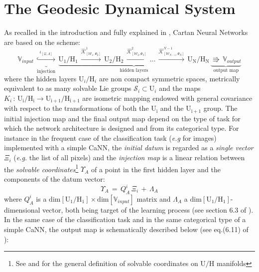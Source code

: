 \documentclass[10pt,a4paper]{article}
\begin{document}
\section{The Geodesic Dynamical System}
\label{geodynsys}
As recalled in the introduction and fully explained in
\cite{TSnaviga}, Cartan Neural Networks are based on the scheme:
\begin{equation}\label{formaggio}
 \mathbb{V}_{input} \, \underbrace{\stackrel{\iota_{[\mathcal{Q},\Lambda]}}{\hookrightarrow}}_{\text{injection}} \,\underbrace{\mathrm{U_1/H_1} \, \stackrel{\hat{\mathcal{K}}^1_{[\mathcal{W}_1,\Psi_2]}}{\longrightarrow} \, \mathrm{U_2/H_2}\, \stackrel{\hat{\mathcal{K}}^2_{[\mathcal{W}_2,\Psi_3]}}{\longrightarrow}  \,\dots \, \stackrel{\hat{\mathcal{K}}^{N-1}_{[\mathcal{W}_{N-1},\Psi_{N}]}}{\longrightarrow} \,\mathrm{U_N/H_N}}_{\text{hidden layers}} \, \underbrace{\boldsymbol{\Rrightarrow} \, \mathbb{V}_{output}}_{\text{output map}}
\end{equation}
where the hidden layers $\mathrm{U}_i/\mathrm{H}_i$ are non compact symmetric spaces, metrically equivalent to as many solvable Lie groups $\mathcal{S}_i \subset \mathrm{U}_i$ and the maps $K_i \, : \, \mathrm{U_i/H_i} \to \mathrm{U_{i+1}/H_{i+1}}$ are  isometric mapping endowed with general covariance with respect to the transformations of both the $\mathrm{U_{i}}$ and the $\mathrm{U_{i+1}}$ group.
The initial injection map and the final output map depend on the type of task for which the network architecture is designed and from its categorical type. For instance in the frequent  case of the classification task (\textit{e.g} for images) implemented with a simple CaNN, the \textit{initial datum} is regarded as a \textit{single vector} $\Xi_i$ (\textit{e.g.} the list of all pixels) and the \textit{injection map} is a linear relation between the \textit{solvable coordinates}\footnote{See \cite{pgtstheory} and \cite{TSnaviga} for the general definition of solvable coordinates on $\mathrm{U/H}$ manifolds} $\Upsilon_A$ of a point in the first hidden layer and  the components of the datum vector:
\begin{equation}\label{tangoliscio}
  \Upsilon_A \,= \,  Q_{A}^i \, \Xi_i \, + \, \Lambda_A
\end{equation}
where $Q_{A}^i$ is a $\mathrm{dim}[{\mathrm{U_1/H_1}}] \times
\mathrm{dim}[\mathbb{V}_{input}]$ matrix and $\Lambda_A$ a
$\mathrm{dim}[{\mathrm{U_1/H_1}}]$-dimensional vector, both being target of the learning process (see section 6.3 of \cite{TSnaviga}). In the same case of the classification task and in the same categorical type of a simple CaNN, the output map is schematically described below (see eq.(6.11) of \cite{TSnaviga}):
\end{document}
